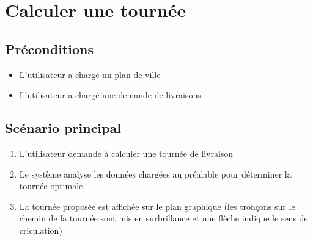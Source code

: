 \documentclass{article}
\begin{document}
\section{Calculer une tournée}

\subsection{Préconditions}

\begin{itemize}
\item L'utilisateur a chargé un plan de ville
\item L'utilisateur a chargé une demande de livraisons
\end{itemize}

\subsection{Scénario principal}

\begin{enumerate}
\item L'utilisateur demande à calculer une tournée de livraison
\item Le système analyse les données chargées au préalable pour déterminer la tournée optimale
\item La tournée proposée est affichée sur le plan graphique (les tronçons sur le chemin de la tournée sont mis en surbrillance et une flèche indique le sens de criculation)
\end{enumerate}


\end{document}
